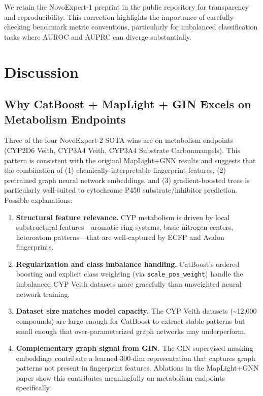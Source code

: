 \documentclass[11pt]{article}
\begin{document}
We retain the NovoExpert-1 preprint in the public repository for transparency and reproducibility. This correction highlights the importance of carefully checking benchmark metric conventions, particularly for imbalanced classification tasks where AUROC and AUPRC can diverge substantially.

\section{Discussion}

\subsection{Why CatBoost + MapLight + GIN Excels on Metabolism Endpoints}

Three of the four NovoExpert-2 SOTA wins are on metabolism endpoints (CYP2D6 Veith, CYP3A4 Veith, CYP3A4 Substrate Carbonmangels). This pattern is consistent with the original MapLight+GNN results \citep{notwell2023maplight} and suggests that the combination of (1) chemically-interpretable fingerprint features, (2) pretrained graph neural network embeddings, and (3) gradient-boosted trees is particularly well-suited to cytochrome P450 substrate/inhibitor prediction. Possible explanations:

\begin{enumerate}
    \item \textbf{Structural feature relevance.} CYP metabolism is driven by local substructural features---aromatic ring systems, basic nitrogen centers, heteroatom patterns---that are well-captured by ECFP and Avalon fingerprints.
    \item \textbf{Regularization and class imbalance handling.} CatBoost's ordered boosting and explicit class weighting (via \texttt{scale\_pos\_weight}) handle the imbalanced CYP Veith datasets more gracefully than unweighted neural network training.
    \item \textbf{Dataset size matches model capacity.} The CYP Veith datasets (\textasciitilde 12{,}000 compounds) are large enough for CatBoost to extract stable patterns but small enough that over-parameterized graph networks may underperform.
    \item \textbf{Complementary graph signal from GIN.} The GIN supervised masking embeddings contribute a learned 300-dim representation that captures graph patterns not present in fingerprint features. Ablations in the MapLight+GNN paper \citep{notwell2023maplight} show this contributes meaningfully on metabolism endpoints specifically.
\end{enumerate}
\end{document}
